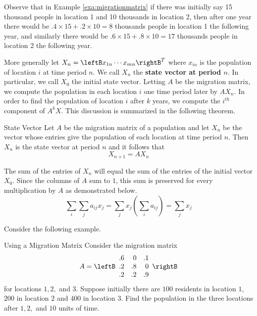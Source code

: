 Observe that in Example \ref{exa:migrationmatrix} if there was initially say 15
thousand people in location 1 and 10 thousands in location 2, then
after one year there would be $.4 \times 15 + .2 \times 10 = 8$
thousands people in location 1 the following year, and similarly 
there would be $.6 \times 15 + .8 \times 10 = 17$
thousands people in location 2 the following year.

More generally let $X_n=\leftB x_{1n} \cdots x_{mn}\rightB ^{T}$ where $x_{in}$ is the
population of location $i$ at time period $n$. We call $X_n$ the \textbf{state vector at period $n$}. In particular, we call $X_0$ the initial state vector. Letting $A$ be the migration matrix, we compute the population in each location $i$ one time period later by $AX_n$. In order to find the population of location $i$ after $k$
years, we compute the $i^{th}$ component of $A^{k}X.$ This discussion is summarized in the following theorem. 

\begin{theorem}{State Vector}\label{thm:statevector}
Let $A$ be the migration matrix of a population and let $X_n$ be the vector whose entries give the population of each location at time period $n$. Then $X_n$ is the state vector at period $n$ and it follows that 
\[
X_{n+1} = A X_n
\]
\end{theorem}

The sum of the entries of $X_n$ will equal the sum of the entries of the initial
vector $X_{0}$. Since the columns of $A$ sum to $1$, this sum is preserved for every
multiplication by $A$ as demonstrated below. 
\begin{equation*}
\sum_{i}\sum_{j}a_{ij}x_{j}=\sum_{j}x_{j}\left( \sum_{i}a_{ij}\right)
=\sum_{j}x_{j}
\end{equation*}

Consider the following example.

\begin{example}{Using a Migration Matrix}\label{exa:usingmigrationmatrix}
Consider the migration matrix 
\begin{equation*}
A = 
\leftB
\begin{array}{rrr}
.6 & 0 & .1 \\
.2 & .8 & 0 \\
.2 & .2 & .9
\end{array}
\rightB 
\end{equation*}
 for locations $1,2,$ and $3.$ Suppose initially there are $100$
residents in location $1$, $200$ in location $2$ and $400$ in location $3$. Find the
population in the three locations after $1,2,$ and $10$ units of time.
\end{example}

